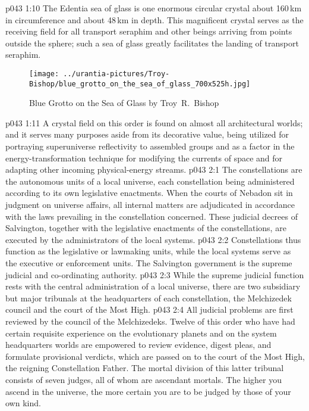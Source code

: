 \vs p043 1:10 The Edentia sea of glass is one enormous circular crystal about 160\,km in circumference and about 48\,km in depth. This magnificent crystal serves as the receiving field for all transport seraphim and other beings arriving from points outside the sphere; such a sea of glass greatly facilitates the landing of transport seraphim.
\begin{figure}[H]
\centering
\texttt{[image: ../urantia-pictures/Troy-Bishop/blue\_grotto\_on\_the\_sea\_of\_glass\_700x525h.jpg]}
\caption{Blue Grotto on the Sea of Glass by Troy~R.~Bishop}
\end{figure}
\vs p043 1:11 A crystal field on this order is found on almost all architectural worlds; and it serves many purposes aside from its decorative value, being utilized for portraying superuniverse reflectivity to assembled groups and as a factor in the energy\hyp{}transformation technique for modifying the currents of space and for adapting other incoming physical\hyp{}energy streams.
\vs p043 2:1 The constellations are the autonomous units of a local universe, each constellation being administered according to its own legislative enactments. When the courts of Nebadon sit in judgment on universe affairs, all internal matters are adjudicated in accordance with the laws prevailing in the constellation concerned. These judicial decrees of Salvington, together with the legislative enactments of the constellations, are executed by the administrators of the local systems.
\vs p043 2:2 Constellations thus function as the legislative or lawmaking units, while the local systems serve as the executive or enforcement units. The Salvington government is the supreme judicial and co\hyp{}ordinating authority.
\vs p043 2:3 \pc While the supreme judicial function rests with the central administration of a local universe, there are two subsidiary but major tribunals at the headquarters of each constellation, the Melchizedek council and the court of the Most High.
\vs p043 2:4 All judicial problems are first reviewed by the council of the Melchizedeks. Twelve of this order who have had certain requisite experience on the evolutionary planets and on the system headquarters worlds are empowered to review evidence, digest pleas, and formulate provisional verdicts, which are passed on to the court of the Most High, the reigning Constellation Father. The mortal division of this latter tribunal consists of seven judges, all of whom are ascendant mortals. The higher you ascend in the universe, the more certain you are to be judged by those of your own kind.
